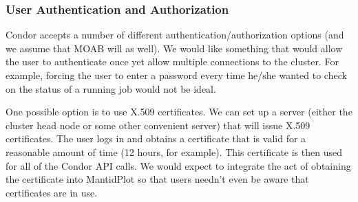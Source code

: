 \subsubsection{User Authentication and Authorization}
Condor accepts a number of different authentication/authorization options (and we assume that MOAB will as well).  We would like something that would allow the user to authenticate once yet allow multiple connections to the cluster.  For example, forcing the user to enter a password every time he/she wanted to check on the status of a running job would not be ideal.

One possible option is to use X.509 certificates.  We can set up a server (either the cluster head node or some other convenient server) that will issue X.509 certificates.  The user logs in and obtains a certificate that is valid for a reasonable amount of time (12 hours, for example).  This certificate is then used for all of the Condor API calls.  We would expect to integrate the act of obtaining the certificate into MantidPlot so that users needn't even be aware that certificates are in use.
